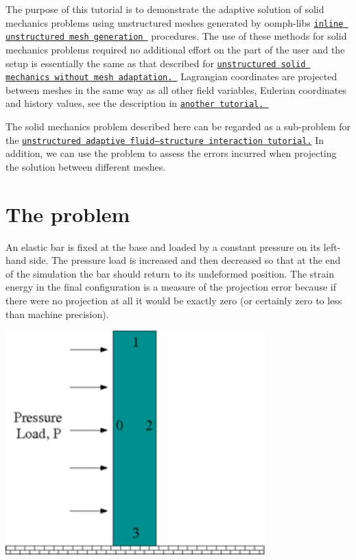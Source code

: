The purpose of this tutorial is to demonstrate the adaptive solution of solid mechanics problems using unstructured meshes generated by {\ttfamily oomph-\/lib\textquotesingle{}s} \href{../../../../doc/meshes/mesh_from_inline_triangle/html/index.html}{\tt inline unstructured mesh generation } procedures. The use of these methods for solid mechanics problems required no additional effort on the part of the user and the setup is essentially the same as that described for \href{../../unstructured_solid/html/index.html}{\tt unstructured solid mechanics without mesh adaptation. } Lagrangian coordinates are projected between meshes in the same way as all other field variables, Eulerian coordinates and history values, see the description in \href{../../../meshes/mesh_from_inline_triangle/html/index.html}{\tt another tutorial. }

The solid mechanics problem described here can be regarded as a sub-\/problem for the \href{../../../../doc/interaction/unstructured_adaptive_fsi/html/index.html}{\tt unstructured adaptive fluid--structure interaction tutorial.} In addition, we can use the problem to assess the errors incurred when projecting the solution between different meshes.



 

\hypertarget{index_problem}{}\section{The problem}\label{index_problem}
An elastic bar is fixed at the base and loaded by a constant pressure on its left-\/hand side. The pressure load is increased and then decreased so that at the end of the simulation the bar should return to its undeformed position. The strain energy in the final configuration is a measure of the projection error because if there were no projection at all it would be exactly zero (or certainly zero to less than machine precision).

 
\begin{DoxyImage}
\includegraphics[width=0.75\textwidth]{solid_sketch}
\end{DoxyImage}




